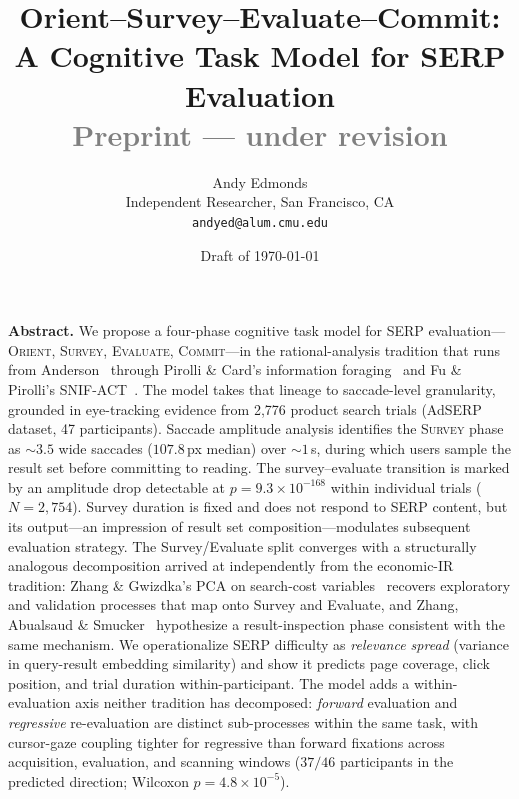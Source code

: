 \documentclass[10pt,twocolumn,letterpaper]{article}
\title{\vspace{-8pt}\textbf{Orient--Survey--Evaluate--Commit:\\A Cognitive Task Model for SERP Evaluation}\\[4pt]
{\normalfont\small\textcolor{gray}{Preprint --- under revision}}\vspace{-4pt}}
\author{
  Andy Edmonds\\[-2pt]
  {\small Independent Researcher, San Francisco, CA}\\[-2pt]
  {\small\texttt{andyed@alum.cmu.edu}}
}
\date{\vspace{-4pt}\small Draft of \today\vspace{-8pt}}
\makeatletter
\renewcommand\section{\@startsection{section}{1}{\z@}{5pt}{2pt}{\normalfont\bfseries\normalsize}}
\renewenvironment{abstract}{\small\noindent\textbf{Abstract.}\enspace\ignorespaces}{\par\vspace{4pt}}
\makeatother
\begin{document}
\maketitle

\begin{abstract}
We propose a four-phase cognitive task model for SERP evaluation---\textsc{Orient}, \textsc{Survey}, \textsc{Evaluate}, \textsc{Commit}---in the rational-analysis tradition that runs from Anderson~\cite{anderson1990adaptive,anderson1991reflections} through Pirolli \& Card's information foraging~\cite{pirolli1999foraging} and Fu \& Pirolli's SNIF-ACT~\cite{fu2007snifact}. The model takes that lineage to saccade-level granularity, grounded in eye-tracking evidence from 2,776 product search trials (AdSERP dataset, 47 participants). Saccade amplitude analysis identifies the \textsc{Survey} phase as ${\sim}3.5$ wide saccades ($107.8$\,px median) over ${\sim}1$\,s, during which users sample the result set before committing to reading. The survey--evaluate transition is marked by an amplitude drop detectable at $p = 9.3 \times 10^{-168}$ within individual trials ($N = 2{,}754$). Survey duration is fixed and does not respond to SERP content, but its output---an impression of result set composition---modulates subsequent evaluation strategy. The Survey/Evaluate split converges with a structurally analogous decomposition arrived at independently from the economic-IR tradition: Zhang \& Gwizdka's PCA on search-cost variables~\cite{zhang2016rethinking} recovers exploratory and validation processes that map onto Survey and Evaluate, and Zhang, Abualsaud \& Smucker~\cite{zhang2018requery} hypothesize a result-inspection phase consistent with the same mechanism. We operationalize SERP difficulty as \emph{relevance spread} (variance in query-result embedding similarity) and show it predicts page coverage, click position, and trial duration within-participant. The model adds a within-evaluation axis neither tradition has decomposed: \emph{forward} evaluation and \emph{regressive} re-evaluation are distinct sub-processes within the same task, with cursor-gaze coupling tighter for regressive than forward fixations across acquisition, evaluation, and scanning windows ($37/46$ participants in the predicted direction; Wilcoxon $p = 4.8 \times 10^{-5}$).
\end{abstract}

\section{Introduction}
\end{document}
